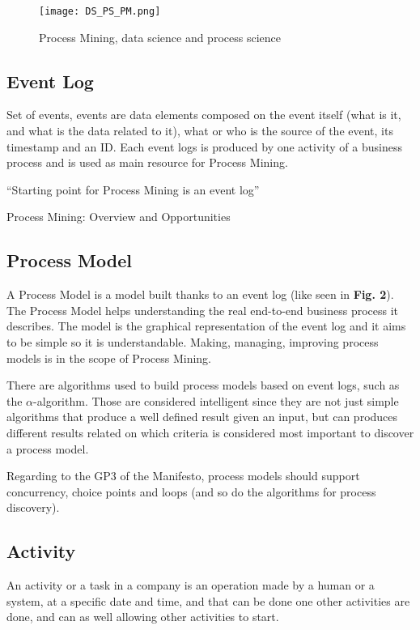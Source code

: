 \documentclass[conference]{IEEEtran}
\begin{document}
\begin{figure}[htp]
    \centering
    \texttt{[image: DS\_PS\_PM.png]}
    \caption{Process Mining, data science and process science}
    \label{fig:modelDrawn}
\end{figure}

\subsection{Event Log}

Set of events, events are data elements composed on the event itself (what is it, and what is the data related to it), what or who is the source of the event, its timestamp and an ID.
Each event logs is produced by one activity of a business process and is used as main resource for Process Mining.

``Starting point for Process Mining is an event log''

Process Mining: Overview and Opportunities

\subsection{Process Model}

A Process Model is a model built thanks to an event log  (like seen in \textbf{Fig. 2}). The Process Model helps understanding the real end-to-end business process it describes. The model is the graphical representation of the event log and it aims to be simple so it is understandable. Making, managing, improving process models is in the scope of Process Mining.

There are algorithms used to build process models based on event logs, such as the $\alpha$-algorithm. Those are considered intelligent since they are not just simple algorithms that produce a well defined result given an input, but can produces different results related on which criteria is considered most important to discover a process model.

Regarding to the GP3 of the Manifesto, process models should support concurrency, choice points and loops (and so do the algorithms for process discovery).

\subsection{Activity}

An activity or a task in a company is an operation made by a human or a system, at a specific date and time, and that can be done one other activities are done, and can as well allowing other activities to start.
\end{document}
